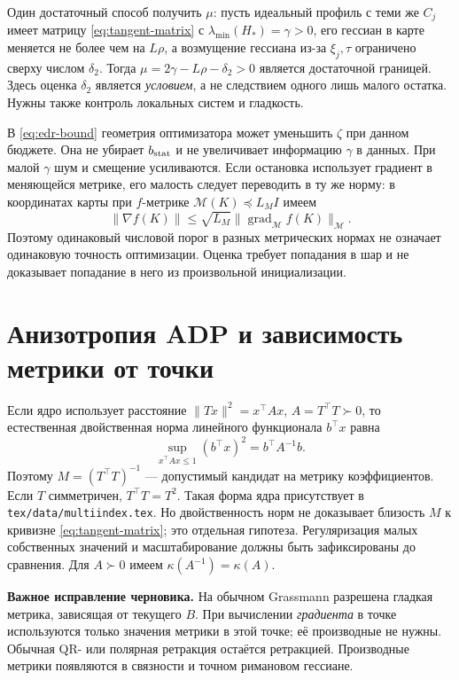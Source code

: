 \documentclass[11pt,a4paper]{article}
\newcommand{\grad}{\operatorname{grad}}
\newcommand{\norm}[1]{\lVert#1\rVert}
\newcommand{\code}[1]{\nolinkurl{#1}}
\theoremstyle{remark}
\begin{document}
Один достаточный способ получить $\mu$: пусть идеальный профиль с
теми же $C_j$ имеет матрицу \eqref{eq:tangent-matrix} с
$\lambda_{\min}(H_*)=\gamma>0$, его гессиан в карте меняется не более
чем на $L\rho$, а возмущение гессиана из-за $\xi_j,\tau$ ограничено
сверху числом $\delta_2$. Тогда
$\mu=2\gamma-L\rho-\delta_2>0$ является достаточной границей.
Здесь оценка $\delta_2$ является \emph{условием}, а не следствием одного
лишь малого остатка. Нужны также контроль локальных систем и гладкость.

В \eqref{eq:edr-bound} геометрия оптимизатора может уменьшить
$\zeta$ при данном бюджете. Она не убирает $b_{\rm stat}$ и не увеличивает
информацию $\gamma$ в данных. При малой $\gamma$ шум и смещение
усиливаются. Если остановка использует градиент в меняющейся метрике,
его малость следует переводить в ту же норму: в координатах карты при
$f$-метрике $\mathcal M(K)\preceq L_M I$ имеем
\[
 \norm{\nabla f(K)}\le\sqrt{L_M}\norm{\grad_{\mathcal M}f(K)}_{\mathcal M}.
\]
Поэтому одинаковый числовой порог в разных метрических нормах не означает
одинаковую точность оптимизации. Оценка требует попадания в шар и не
доказывает попадание в него из произвольной инициализации.

\section{Анизотропия ADP и зависимость метрики от точки}

Если ядро использует расстояние $\norm{Tx}^2=x^\top Ax$,
$A=T^\top T\succ0$, то естественная двойственная норма линейного
функционала $b^\top x$ равна
\begin{equation}\label{eq:dual}
 \sup_{x^\top Ax\le1}(b^\top x)^2=b^\top A^{-1}b.
\end{equation}
Поэтому $M=(T^\top T)^{-1}$ --- допустимый кандидат на метрику
коэффициентов. Если $T$ симметричен, $T^\top T=T^2$.
Такая форма ядра присутствует в \code{tex/data/multiindex.tex}.
Но двойственность норм не доказывает близость $M$ к кривизне
\eqref{eq:tangent-matrix}; это отдельная гипотеза. Регуляризация малых
собственных значений и масштабирование должны быть зафиксированы до
сравнения. Для $A\succ0$ имеем $\kappa(A^{-1})=\kappa(A)$.

\textbf{Важное исправление черновика.}
На обычном Grassmann разрешена гладкая метрика, зависящая от текущего
$B$. При вычислении \emph{градиента} в точке используются только значения
метрики в этой точке; её производные не нужны. Обычная QR- или полярная
ретракция остаётся ретракцией. Производные метрики появляются в
связности и точном римановом гессиане.
\end{document}
